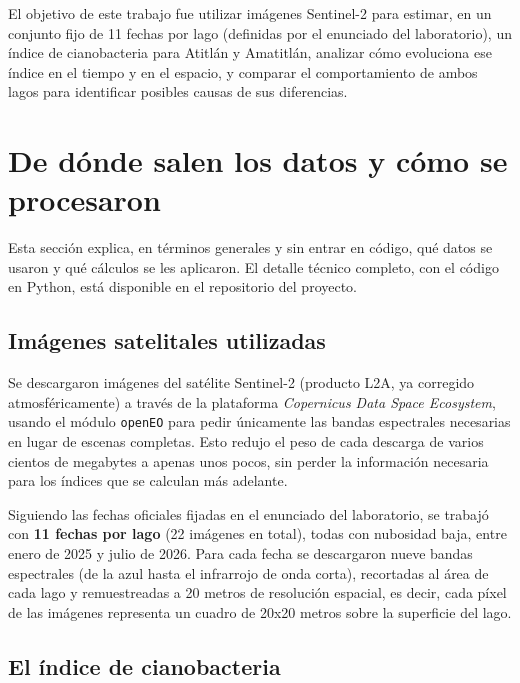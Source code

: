 \documentclass[11pt]{article}
\begin{document}
El objetivo de este trabajo fue utilizar im\'agenes Sentinel-2 para estimar, en un conjunto fijo de 11 fechas por lago (definidas por el enunciado del laboratorio), un \'indice de cianobacteria para Atitl\'an y Amatitl\'an, analizar c\'omo evoluciona ese \'indice en el tiempo y en el espacio, y comparar el comportamiento de ambos lagos para identificar posibles causas de sus diferencias.

\section{De d\'onde salen los datos y c\'omo se procesaron}

Esta secci\'on explica, en t\'erminos generales y sin entrar en c\'odigo, qu\'e datos se usaron y qu\'e c\'alculos se les aplicaron. El detalle t\'ecnico completo, con el c\'odigo en Python, est\'a disponible en el repositorio del proyecto.

\subsection{Im\'agenes satelitales utilizadas}

Se descargaron im\'agenes del sat\'elite Sentinel-2 (producto L2A, ya corregido atmosf\'ericamente) a trav\'es de la plataforma \emph{Copernicus Data Space Ecosystem}, usando el m\'odulo \texttt{openEO} para pedir \'unicamente las bandas espectrales necesarias en lugar de escenas completas. Esto redujo el peso de cada descarga de varios cientos de megabytes a apenas unos pocos, sin perder la informaci\'on necesaria para los \'indices que se calculan m\'as adelante.

Siguiendo las fechas oficiales fijadas en el enunciado del laboratorio, se trabaj\'o con \textbf{11 fechas por lago} (22 im\'agenes en total), todas con nubosidad baja, entre enero de 2025 y julio de 2026. Para cada fecha se descargaron nueve bandas espectrales (de la azul hasta el infrarrojo de onda corta), recortadas al \'area de cada lago y remuestreadas a 20 metros de resoluci\'on espacial, es decir, cada p\'ixel de las im\'agenes representa un cuadro de 20x20 metros sobre la superficie del lago.

\subsection{El \'indice de cianobacteria}
\end{document}
